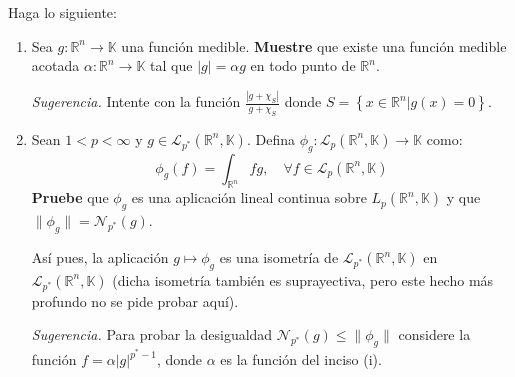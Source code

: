 \documentclass[12pt]{report}
\newcounter{it}
\theoremstyle{largebreak}
\newcommand\abs[1]{\ensuremath{\left|#1\right|}}
\newcommand\cf[3]{\ensuremath{#1:#2\rightarrow#3}}
\newcommand{\N}[2]{\ensuremath{\mathcal{N}_{#1}\left(#2\right)}}
\begin{document}
    \begin{excer}
        Haga lo siguiente:
        \begin{enumerate}
            \item Sea $\cf{g}{\mathbb{R}^n}{\mathbb{K}}$ una función medible. \textbf{Muestre} que existe una función medible acotada $\cf{\alpha}{\mathbb{R}^n}{\mathbb{K}}$ tal que $\abs{g}=\alpha g$ en todo punto de $\mathbb{R}^n$.
            
            \textit{Sugerencia.} Intente con la función $\frac{\abs{g+\chi_S}}{g+\chi_S}$ donde $S=\left\{x\in\mathbb{R}^n\Big|g(x)=0 \right\}$.

            \item Sean $1<p<\infty$ y $g\in\mathcal{L}_{p^*}(\mathbb{R}^n,\mathbb{K})$. Defina $\cf{\phi_g}{\mathcal{L}_p(\mathbb{R}^n,\mathbb{K})}{\mathbb{K}}$ como:
            \begin{equation*}
                \phi_g(f)=\int_{\mathbb{R}^n}fg,\quad\forall f\in\mathcal{L}_p(\mathbb{R}^n,\mathbb{K})
            \end{equation*}
            \textbf{Pruebe} que $\phi_g$ es una aplicación lineal continua sobre $L_p(\mathbb{R}^n,\mathbb{K})$ y que $\|\phi_g\|=\N{p^*}{g}$.

            Así pues, la aplicación $g\mapsto\phi_g$ es una isometría de $\mathcal{L}_{p^*}(\mathbb{R}^n,\mathbb{K})$ en $\mathcal{L}_{p^*}(\mathbb{R}^n,\mathbb{K})$ (dicha isometría también es suprayectiva, pero este hecho más profundo no se pide probar aquí).

            \textit{Sugerencia.} Para probar la desigualdad $\N{p^*}{g}\leq\|\phi_g\|$ considere la función $f=\alpha\abs{g}^{p^*-1}$, donde $\alpha$ es la función del inciso (i).


\end{enumerate}
\end{excer}
\end{document}
